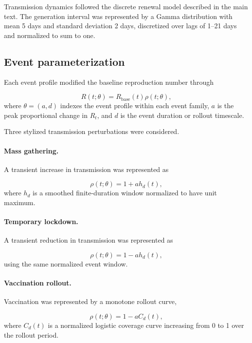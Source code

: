 Transmission dynamics followed the discrete renewal model described in the main text. The generation interval was represented by a Gamma distribution with mean 5 days and standard deviation 2 days, discretized over lags of 1--21 days and normalized to sum to one.



\subsection{Event parameterization}

Each event profile modified the baseline reproduction number through

\begin{equation}
R(t;\theta)
=
R_{\mathrm{base}}(t)\rho(t;\theta),
\end{equation}
where \(\theta=(a,d)\) indexes the event profile within each event family, \(a\) is the peak proportional change in \(R_t\), and \(d\) is the event duration or rollout timescale.

Three stylized transmission perturbations were considered.

\paragraph{Mass gathering.}

A transient increase in transmission was represented as

\[
\rho(t;\theta)
=
1
+
a
h_d(t),
\]
where \(h_d\) is a smoothed finite-duration window normalized to have unit maximum.

\paragraph{Temporary lockdown.}

A transient reduction in transmission was represented as

\[
\rho(t;\theta)
=
1
-
a
h_d(t),
\]
using the same normalized event window.

\paragraph{Vaccination rollout.}

Vaccination was represented by a monotone rollout curve,

\[
\rho(t;\theta)
=
1
-
a
C_d(t),
\]
where \(C_d(t)\) is a normalized logistic coverage curve increasing from 0 to 1 over the rollout period.


